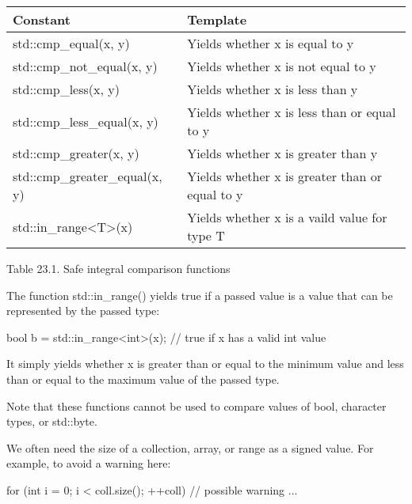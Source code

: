 \begin{longtable}[c]{|l|l|}
\hline
\textbf{Constant}          & \textbf{Template}                  \\ \hline
\endfirsthead
%
\endhead
%
std::cmp\_equal(x, y)      & Yields whether x is equal to y     \\ \hline
std::cmp\_not\_equal(x, y) & Yields whether x is not equal to y \\ \hline
std::cmp\_less(x, y)       & Yields whether x is less than y    \\ \hline
std::cmp\_less\_equal(x, y)                 & Yields whether x is less than or equal to y    \\ \hline
std::cmp\_greater(x, y)    & Yields whether x is greater than y \\ \hline
std::cmp\_greater\_equal(x, y)              & Yields whether x is greater than or equal to y \\ \hline
std::in\_range\textless{}T\textgreater{}(x) & Yields whether x is a vaild value for type T   \\ \hline
\end{longtable}

\begin{center}
Table 23.1. Safe integral comparison functions
\end{center}

The function std::in\_range() yields true if a passed value is a value that can be represented by the passed type:

\begin{cpp}
bool b = std::in_range<int>(x); // true if x has a valid int value
\end{cpp}

It simply yields whether x is greater than or equal to the minimum value and less than or equal to the maximum value of the passed type.

Note that these functions cannot be used to compare values of bool, character types, or std::byte.


We often need the size of a collection, array, or range as a signed value. For example, to avoid a warning here:

\begin{cpp}
for (int i = 0; i < coll.size(); ++coll) { // possible warning
	...
}
\end{cpp}

